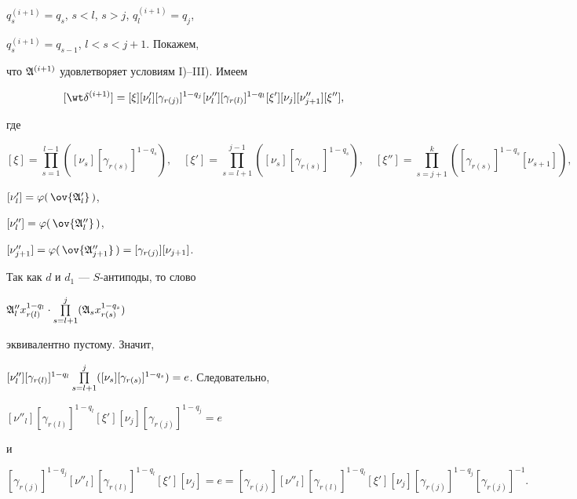$q^{(i+1)}_s=q_s$, $s<l$, $s>j$, $q^{(i+1)}_l=q_j$,


$q^{(i+1)}_s=q_{s-1}$, $l<s<j+1$. Покажем,


что $\frak A^{(i+1)}$ удовлетворяет условиям I)--III). Имеем


\begin{equation}


[\wt \delta^{(i+1)}]=


[\xi][\nu'_l][\gamma_{r(j)}]^{1-q_j}[\nu''_l]


[\gamma_{r(l)}]^{1-q_l}[\xi'][\nu_j][\nu ''_{j +1}][\xi''],


\label{(17.15)}


\end{equation}


где


$$


[\xi]=\prod^{l-1}_{s=1}


([\nu_s][\gamma_{r(s)}]^{1-q_s}),\quad


[\xi']=\prod_{s=l+1}^{j-1}([\nu_{{s}}][\gamma_{r(s)}]^{1-q_s}), \quad


[\xi '']=\prod_{s=j+1}^k([\gamma_{r(s)}]^{1-q_s}[\nu_{s+1}]),


$$


$[\nu'_l]=\varphi(\,\ov{\frak A'_l}\,)$,


$[\nu''_{l}]=\varphi(\,\ov{\frak A''_{l}}\,)$,


$[\nu''_{j+1}]=\varphi(\,\ov{\frak A''_{j+1}}\,)=[\gamma_{r(j)}][\nu_{j+1}]$.





Так как $d$ и $d_1$ --- $S$-антиподы, то слово


$\frak A''_l x^{1-q_l}_{r(l)}\cdot


\PL_{s=l+1}^j(\frak A_s x^{1-q_s}_{r(s)})$


эквивалентно пустому. Значит,


$[\nu''_l][\gamma_{r(l)}]^{1-q_l}\PL_{s=l+1}^j([\nu_s]


[\gamma_{r(s)}]^{1-q_s})=e$. Следовательно,


$[\nu''_l][\gamma_{r(l)}]^{1-q_l}


[\xi'][\nu_j][\gamma_{r(j)}]^{1-q_j}=e$


и


\begin{equation}


[\gamma_{r(j)}]^{1-q_j}[\nu''_l][\gamma_{r(l)}]^{1-q_l}


[\xi'][\nu_j]=e=[\gamma_{r(j)}][\nu''_l][\gamma_{r(l)}]^{1-q_l}


[\xi'][\nu_j][\gamma_{r(j)}]^{1-q_j}[\gamma_{r(j)}]^{-1}.


\label{(17.16)}


\end{equation}


